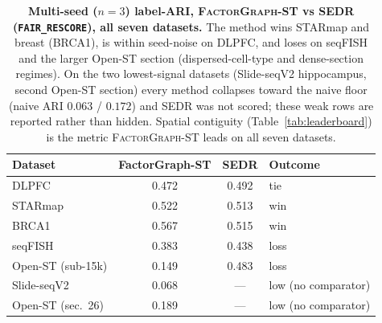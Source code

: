 \documentclass[10pt,letterpaper]{article}
\begin{document}
\begin{table}[t]
  \centering
  \small
  \caption{\textbf{Multi-seed ($n{=}3$) label-ARI, \textsc{FactorGraph-ST} vs SEDR
  (\texttt{FAIR\_RESCORE}), all seven datasets.} The method wins STARmap and breast (BRCA1),
  is within seed-noise on DLPFC, and loses on seqFISH and the larger Open-ST section
  (dispersed-cell-type and dense-section regimes). On the two lowest-signal datasets
  (Slide-seqV2 hippocampus, second Open-ST section) every method collapses toward the naive
  floor (naive ARI $0.063$ / $0.172$) and SEDR was not scored; these weak rows are reported
  rather than hidden. Spatial contiguity (Table~\ref{tab:leaderboard}) is the metric
  \textsc{FactorGraph-ST} leads on all seven datasets.}
  \label{tab:ari}
  \begin{tabular}{@{}lccl@{}}
    \toprule
    Dataset             & FactorGraph-ST & SEDR  & Outcome \\
    \midrule
    DLPFC               & 0.472 & 0.492 & tie  \\
    STARmap             & 0.522 & 0.513 & win  \\
    BRCA1               & 0.567 & 0.515 & win  \\
    seqFISH             & 0.383 & 0.438 & loss \\
    Open-ST (sub-15k)   & 0.149 & 0.483 & loss \\
    Slide-seqV2         & 0.068 & ---   & low (no comparator) \\
    Open-ST (sec.\ 26)  & 0.189 & ---   & low (no comparator) \\
    \bottomrule
  \end{tabular}
\end{table}
\end{document}
